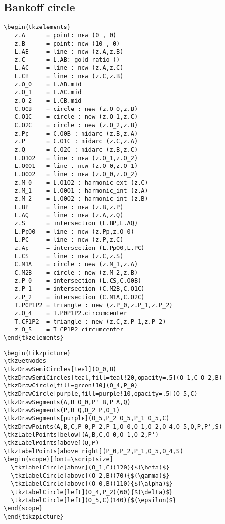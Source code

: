 \subsection{Bankoff circle} %
\label{sub:bankoff_circle}
\begin{Verbatim}
\begin{tkzelements}
   z.A      = point: new (0 , 0)
   z.B      = point: new (10 , 0)
   L.AB     = line : new (z.A,z.B)
   z.C      = L.AB: gold_ratio ()
   L.AC     = line : new (z.A,z.C)
   L.CB     = line : new (z.C,z.B)
   z.O_0    = L.AB.mid
   z.O_1    = L.AC.mid
   z.O_2    = L.CB.mid
   C.O0B    = circle : new (z.O_0,z.B)
   C.O1C    = circle : new (z.O_1,z.C)
   C.O2C    = circle : new (z.O_2,z.B)
   z.Pp     = C.O0B : midarc (z.B,z.A)
   z.P      = C.O1C : midarc (z.C,z.A)
   z.Q      = C.O2C : midarc (z.B,z.C)
   L.O1O2   = line : new (z.O_1,z.O_2)
   L.O0O1   = line : new (z.O_0,z.O_1)
   L.O0O2   = line : new (z.O_0,z.O_2)
   z.M_0    = L.O1O2 : harmonic_ext (z.C)
   z.M_1    = L.O0O1 : harmonic_int (z.A)
   z.M_2    = L.O0O2 : harmonic_int (z.B)
   L.BP     = line : new (z.B,z.P)
   L.AQ     = line : new (z.A,z.Q)
   z.S      = intersection (L.BP,L.AQ)
   L.PpO0   = line : new (z.Pp,z.O_0)
   L.PC     = line : new (z.P,z.C)
   z.Ap     = intersection (L.PpO0,L.PC)
   L.CS     = line : new (z.C,z.S)
   C.M1A    = circle : new (z.M_1,z.A)
   C.M2B    = circle : new (z.M_2,z.B)
   z.P_0    = intersection (L.CS,C.O0B)
   z.P_1    = intersection (C.M2B,C.O1C)
   z.P_2    = intersection (C.M1A,C.O2C)
   T.P0P1P2 = triangle : new (z.P_0,z.P_1,z.P_2)
   z.O_4    = T.P0P1P2.circumcenter
   T.CP1P2  = triangle : new (z.C,z.P_1,z.P_2)
   z.O_5    = T.CP1P2.circumcenter
\end{tkzelements}
\end{Verbatim}

\begin{Verbatim}
\begin{tikzpicture}
\tkzGetNodes
\tkzDrawSemiCircles[teal](O_0,B)
\tkzDrawSemiCircles[teal,fill=teal!20,opacity=.5](O_1,C O_2,B)
\tkzDrawCircle[fill=green!10](O_4,P_0)
\tkzDrawCircle[purple,fill=purple!10,opacity=.5](O_5,C)
\tkzDrawSegments(A,B O_0,P' B,P A,Q)
\tkzDrawSegments(P,B Q,O_2 P,O_1)
\tkzDrawSegments[purple](O_5,P_2 O_5,P_1 O_5,C)
\tkzDrawPoints(A,B,C,P_0,P_2,P_1,O_0,O_1,O_2,O_4,O_5,Q,P,P',S)
\tkzLabelPoints[below](A,B,C,O_0,O_1,O_2,P')
\tkzLabelPoints[above](Q,P)
\tkzLabelPoints[above right](P_0,P_2,P_1,O_5,O_4,S)
\begin{scope}[font=\scriptsize]
  \tkzLabelCircle[above](O_1,C)(120){$(\beta)$}
  \tkzLabelCircle[above](O_2,B)(70){$(\gamma)$}
  \tkzLabelCircle[above](O_0,B)(110){$(\alpha)$}
  \tkzLabelCircle[left](O_4,P_2)(60){$(\delta)$}
  \tkzLabelCircle[left](O_5,C)(140){$(\epsilon)$}
\end{scope}
\end{tikzpicture}
\end{Verbatim}


